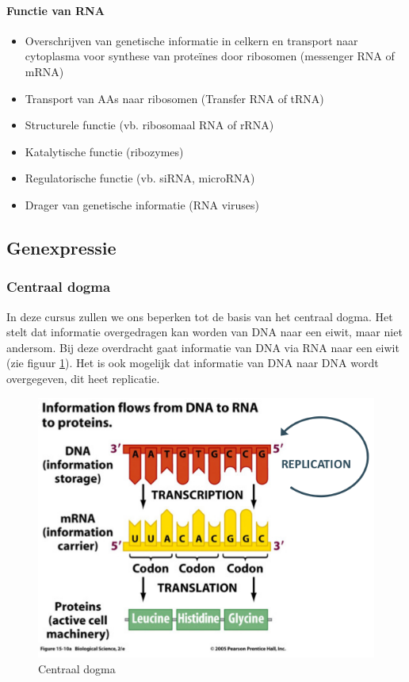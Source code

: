 \documentclass[a4paper,kul]{kulakarticle} %
\begin{document}
\paragraph{Functie van RNA}
\begin{itemize}
	\item Overschrijven van genetische informatie in celkern en transport
	naar cytoplasma voor synthese van proteïnes door ribosomen
	(messenger RNA of mRNA)
	\item Transport van AAs naar ribosomen (Transfer RNA of tRNA)
	\item Structurele functie (vb. ribosomaal RNA of rRNA)
	\item Katalytische functie (ribozymes)
	\item Regulatorische functie (vb. siRNA, microRNA)
	\item Drager van genetische informatie (RNA viruses)
\end{itemize}
\subsection{Genexpressie}
\subsubsection{Centraal dogma}
In deze cursus zullen we ons beperken tot de basis van het centraal dogma. Het stelt dat informatie overgedragen kan worden van DNA naar een eiwit, maar niet andersom. Bij deze overdracht gaat informatie van DNA via RNA naar een eiwit (zie figuur \ref{fig:centraaldogma}). Het is ook mogelijk dat informatie van DNA naar DNA wordt overgegeven, dit heet replicatie. 
\begin{figure}[h]
	\centering
	\includegraphics[width=0.7\linewidth]{CentraalDogma}
	\caption[Centraal Dogma]{Centraal dogma}
	\label{fig:centraaldogma}
\end{figure}
\end{document}
